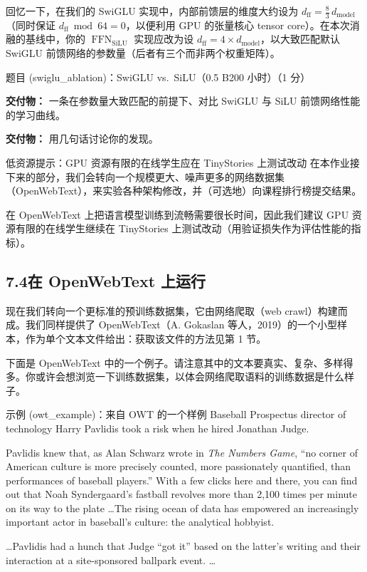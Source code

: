 回忆一下，在我们的 SwiGLU 实现中，内部前馈层的维度大约设为 $d_{\mathrm{ff}} = \tfrac{8}{3}\,d_{\mathrm{model}}$（同时保证 $d_{\mathrm{ff}} \bmod 64 = 0$，以便利用 GPU 的张量核心 tensor core）。在本次消融的基线中，你的 $\operatorname{FFN}_{\mathrm{SiLU}}$ 实现应改为设 $d_{\mathrm{ff}} = 4 \times d_{\mathrm{model}}$，以大致匹配默认 SwiGLU 前馈网络的参数量（后者有三个而非两个权重矩阵）。

\begin{problembox}{题目 (swiglu\_ablation)：SwiGLU vs.\ SiLU（0.5 B200 小时）（1 分）}
\begin{deliverablebox}
\textbf{交付物：} 一条在参数量大致匹配的前提下、对比 SwiGLU 与 SiLU 前馈网络性能的学习曲线。
\end{deliverablebox}
\begin{deliverablebox}
\textbf{交付物：} 用几句话讨论你的发现。
\end{deliverablebox}
\end{problembox}

\begin{tipbox}{低资源提示：GPU 资源有限的在线学生应在 TinyStories 上测试改动}
在本作业接下来的部分，我们会转向一个规模更大、噪声更多的网络数据集（OpenWebText），来实验各种架构修改，并（可选地）向课程排行榜提交结果。

在 OpenWebText 上把语言模型训练到流畅需要很长时间，因此我们建议 GPU 资源有限的在线学生继续在 TinyStories 上测试改动（用验证损失作为评估性能的指标）。
\end{tipbox}

\subsection*{7.4\quad 在 OpenWebText 上运行}
现在我们转向一个更标准的预训练数据集，它由网络爬取（web crawl）构建而成。我们同样提供了 OpenWebText（A. Gokaslan 等人，2019）的一个小型样本，作为单个文本文件给出：获取该文件的方法见第 1 节。

下面是 OpenWebText 中的一个例子。请注意其中的文本要真实、复杂、多样得多。你或许会想浏览一下训练数据集，以体会网络爬取语料的训练数据是什么样子。

\begin{problembox}{示例 (owt\_example)：来自 OWT 的一个样例}
\small
Baseball Prospectus director of technology Harry Pavlidis took a risk when he hired Jonathan Judge.

Pavlidis knew that, as Alan Schwarz wrote in \textit{The Numbers Game}, ``no corner of American culture is more precisely counted, more passionately quantified, than performances of baseball players.'' With a few clicks here and there, you can find out that Noah Syndergaard's fastball revolves more than 2,100 times per minute on its way to the plate \ldots The rising ocean of data has empowered an increasingly important actor in baseball's culture: the analytical hobbyist.

\ldots Pavlidis had a hunch that Judge ``got it'' based on the latter's writing and their interaction at a site-sponsored ballpark event. \lbrack\ldots\rbrack
\end{problembox}

